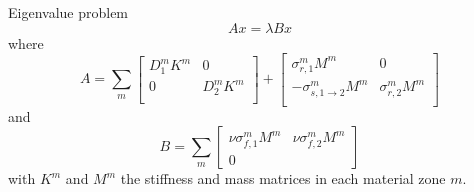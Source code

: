 \documentclass[12pt]{article}
\begin{document}
Eigenvalue problem
\[
A x = \lambda Bx
\]
where
\[
A = \sum_m 
\begin{bmatrix}
D_1^m K^m & 0\\
0 & D_2^m K^m \\
\end{bmatrix}
+
\begin{bmatrix}
\sigma_{r,1}^m M^m & 0\\
-\sigma_{s,1\to2}^m M^m & \sigma_{r,2}^m M^m \\
\end{bmatrix}
\]
and
\[
B = \sum_m 
\begin{bmatrix}
\nu\sigma_{f,1}^m M^m & \nu\sigma_{f,2}^m M^m \\
0 & 
\end{bmatrix}
\]
with $K^m$ and $M^m$ the stiffness and mass matrices in each material zone $m$.
\end{document}
